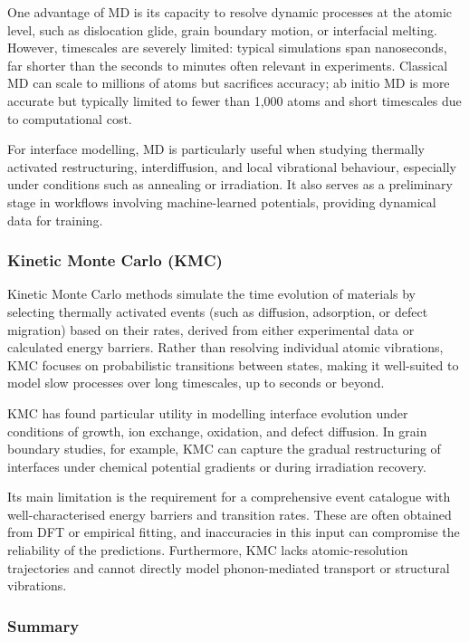 One advantage of MD is its capacity to resolve dynamic processes at the atomic level, such as dislocation glide, grain boundary motion, or interfacial melting. However, timescales are severely limited: typical simulations span nanoseconds, far shorter than the seconds to minutes often relevant in experiments. Classical MD can scale to millions of atoms but sacrifices accuracy; ab initio MD is more accurate but typically limited to fewer than 1,000 atoms and short timescales due to computational cost.

For interface modelling, MD is particularly useful when studying thermally activated restructuring, interdiffusion, and local vibrational behaviour, especially under conditions such as annealing or irradiation. It also serves as a preliminary stage in workflows involving machine-learned potentials, providing dynamical data for training.

\subsubsection{Kinetic Monte Carlo (KMC)}

Kinetic Monte Carlo methods simulate the time evolution of materials by selecting thermally activated events (such as diffusion, adsorption, or defect migration) based on their rates, derived from either experimental data or calculated energy barriers. Rather than resolving individual atomic vibrations, KMC focuses on probabilistic transitions between states, making it well-suited to model slow processes over long timescales, up to seconds or beyond.

KMC has found particular utility in modelling interface evolution under conditions of growth, ion exchange, oxidation, and defect diffusion. In grain boundary studies, for example, KMC can capture the gradual restructuring of interfaces under chemical potential gradients or during irradiation recovery.

Its main limitation is the requirement for a comprehensive event catalogue with well-characterised energy barriers and transition rates. These are often obtained from DFT or empirical fitting, and inaccuracies in this input can compromise the reliability of the predictions. Furthermore, KMC lacks atomic-resolution trajectories and cannot directly model phonon-mediated transport or structural vibrations.

\subsubsection{Summary}

